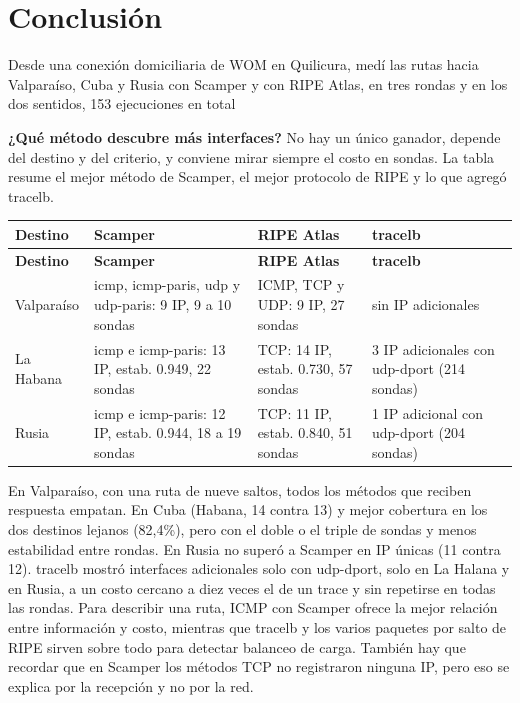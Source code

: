 \section{Conclusión}\label{sec:conclusion}

Desde una conexión domiciliaria de WOM en Quilicura, medí las rutas hacia Valparaíso, Cuba y Rusia con Scamper y con RIPE Atlas, en tres rondas y en los dos sentidos, 153 ejecuciones en total 

\textbf{¿Qué método descubre más interfaces?} No hay un único ganador, depende del destino y del criterio, y conviene mirar siempre el costo en sondas. La tabla resume el mejor método de Scamper, el mejor protocolo de RIPE y lo que agregó tracelb.


\begingroup
\fontsize{9}{11}\selectfont
\addtocounter{table}{-1}
\begin{longtable}{p{2.2cm}p{4.7cm}p{4.6cm}p{3.3cm}}
\toprule
\textbf{Destino} & \textbf{Scamper} & \textbf{RIPE Atlas} & \textbf{tracelb} \\ \midrule
\endfirsthead
\toprule
\textbf{Destino} & \textbf{Scamper} & \textbf{RIPE Atlas} & \textbf{tracelb} \\ \midrule
\endhead
Valparaíso & icmp, icmp-paris, udp y udp-paris: 9 IP, 9 a 10 sondas & ICMP, TCP y UDP: 9 IP, 27 sondas & sin IP adicionales \\
La Habana & icmp e icmp-paris: 13 IP, estab. 0.949, 22 sondas & TCP: 14 IP, estab. 0.730, 57 sondas & 3 IP adicionales con udp-dport (214 sondas) \\
Rusia & icmp e icmp-paris: 12 IP, estab. 0.944, 18 a 19 sondas & TCP: 11 IP, estab. 0.840, 51 sondas & 1 IP adicional con udp-dport (204 sondas) \\
\bottomrule
\end{longtable}
\endgroup

En Valparaíso, con una ruta de nueve saltos, todos los métodos que reciben respuesta empatan. En Cuba (Habana, 14 contra 13) y mejor cobertura en los dos destinos lejanos (82,4\%), pero con el doble o el triple de sondas y menos estabilidad entre rondas. En Rusia no superó a Scamper en IP únicas (11 contra 12). tracelb mostró interfaces adicionales solo con udp-dport, solo en La Halana y en Rusia, a un costo cercano a diez veces el de un trace y sin repetirse en todas las rondas. Para describir una ruta, ICMP con Scamper ofrece la mejor relación entre información y costo, mientras que tracelb y los varios paquetes por salto de RIPE sirven sobre todo para detectar balanceo de carga. También hay que recordar que en Scamper los métodos TCP no registraron ninguna IP, pero eso se explica por la recepción y no por la red. \\

